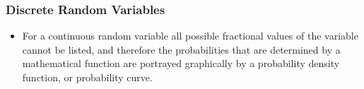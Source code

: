 \documentclass{beamer}
\begin{document}
\begin{frame}
\frametitle{Discrete Random Variables}
\Large
\vspace{-1cm}
\begin{itemize}
\item For a continuous random variable all possible fractional values of the variable cannot be listed, and
therefore the probabilities that are determined by a mathematical function are portrayed graphically by a
probability density function, or probability curve.
\end{itemize}
\end{frame}
\end{document}
